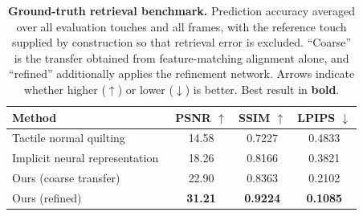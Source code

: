 \begin{table}[t]
  \centering
  \small
  \caption{\textbf{Ground-truth retrieval benchmark.} Prediction accuracy averaged over all
    evaluation touches and all frames, with the reference touch supplied by construction so that
    retrieval error is excluded. ``Coarse'' is the transfer obtained from feature-matching
    alignment alone, and ``refined'' additionally applies the refinement network. Arrows indicate
    whether higher ($\uparrow$) or lower ($\downarrow$) is better. Best result in \textbf{bold}.}
  \label{tab:gt_retrieval}
  \begin{tabular}{l c c c}
    \hline
    Method & PSNR $\uparrow$ & SSIM $\uparrow$ & LPIPS $\downarrow$ \\
    \hline
    Tactile normal quilting~\cite{tactiledreamfusion} & 14.58 & 0.7227 & 0.4833 \\
    Implicit neural representation~\cite{objectfolder} & 18.26 & 0.8166 & 0.3821 \\
    \hline
    Ours (coarse transfer)                        & 22.90 & 0.8363 & 0.2102 \\
    Ours (refined)                                & \textbf{31.21} & \textbf{0.9224} & \textbf{0.1085} \\
    \hline
  \end{tabular}
\end{table}

